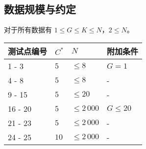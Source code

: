 \documentclass[UTF8, 11pt, a4paper]{article}
\begin{document}
\subsection*{数据规模与约定}
对于所有数据有 $1 \leq G \leq K \leq N$，$2 \leq N$。

\begin{table}[h]\centering
\begin{tabularx}{0.85 \textwidth}{X|X|X|X} \hline
测试点编号 & $C^*$ & $N$           & 附加条件 \\ \hline\hline
1 - 3      & $5$   & $\leq 8$      & $G = 1$ \\ \hline
4 - 8      & $5$   & $\leq 8$      & - \\ \hline
9 - 15     & $5$   & $\leq 20$     & - \\ \hline
16 - 20    & $5$   & $\leq 2\,000$ & $G \leq 20$ \\ \hline
21 - 23    & $5$   & $\leq 2\,000$ & - \\ \hline
24 - 25    & $10$  & $\leq 2\,000$ & - \\ \hline
\end{tabularx}
\end{table}
\end{document}
